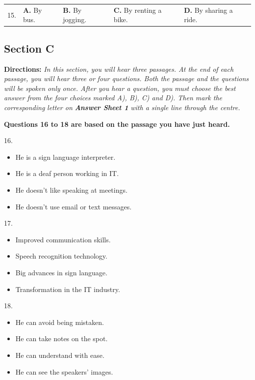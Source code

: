 \documentclass[UTF8,11pt]{ctexart}
\begin{document}
\noindent\begin{tabularx}{\linewidth}{@{}lXXXX@{}}15. & \textbf{A.} By bus. & \textbf{B.} By jogging. & \textbf{C.} By renting a bike. & \textbf{D.} By sharing a ride.\\\end{tabularx}\par

\subsection*{\textbf{Section C}}


\textbf{Directions:}\textit{ In this section, you will hear three passages. At the end of each passage, you will hear three or} \textit{four questions. Both the passage and the questions will be spoken only once. After you hear a question, you} \textit{must choose the best answer from the four choices marked A), B), C) and D). Then mark the corresponding} \textit{letter on }\textbf{\textit{Answer Sheet 1}}\textit{ with a single line through the centre.}


\textbf{Questions 16 to 18 are based on the passage you have just heard.}


16.


\begin{itemize}[leftmargin=2em,itemsep=.2em,topsep=.4em]\item[A.] He is a sign language interpreter.
\item[B.] He is a deaf person working in IT.
\item[C.] He doesn't like speaking at meetings.
\item[D.] He doesn't use email or text messages.
\end{itemize}

17.


\begin{itemize}[leftmargin=2em,itemsep=.2em,topsep=.4em]\item[A.] Improved communication skills.
\item[B.] Speech recognition technology.
\item[C.] Big advances in sign language.
\item[D.] Transformation in the IT industry.
\end{itemize}

18.


\begin{itemize}[leftmargin=2em,itemsep=.2em,topsep=.4em]\item[A.] He can avoid being mistaken.
\item[B.] He can take notes on the spot.
\item[C.] He can understand with ease.
\item[D.] He can see the speakers' images.
\end{itemize}
\end{document}
